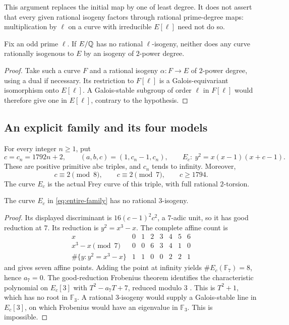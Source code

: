 This argument replaces the initial map by one of least degree. It does
not assert that every given rational isogeny factors through rational
prime-degree maps: multiplication by $\ell$ on a curve with
irreducible $E[\ell]$ need not do so.

\begin{lemma}\label{lem:entire-odd-transport}
Fix an odd prime $\ell$. If $E/\mathbb Q$ has no rational $\ell$-isogeny,
neither does any curve rationally isogenous to $E$ by an isogeny of
$2$-power degree.
\end{lemma}

\begin{proof}
Take such a curve $F$ and a rational isogeny $\alpha:F\to E$ of
$2$-power degree, using a dual if necessary. Its restriction to
$F[\ell]$ is a Galois-equivariant isomorphism onto $E[\ell]$.
A Galois-stable subgroup of order $\ell$ in $F[\ell]$ would therefore
give one in $E[\ell]$, contrary to the hypothesis.
\end{proof}

\subsection{An explicit family and its four models}

For every integer $n\ge1$, put
\begin{equation}\label{eq:entire-family}
 c=c_n=1792n+2,\qquad (a,b,c)=(1,c_n-1,c_n),\qquad
 E_c:\ y^2=x(x-1)(x+c-1).
\end{equation}
These are positive primitive abc triples, and $c_n$ tends to infinity.
Moreover,
\[
 c\equiv2\pmod8,\qquad c\equiv2\pmod7,\qquad c\ge1794.
\]
The curve $E_c$ is the actual Frey curve of this triple, with full
rational $2$-torsion.

\begin{lemma}\label{lem:entire-no-three}
The curve $E_c$ in \eqref{eq:entire-family} has no rational
$3$-isogeny.
\end{lemma}

\begin{proof}
Its displayed discriminant is $16(c-1)^2c^2$, a $7$-adic unit, so it
has good reduction at $7$. Its reduction is $y^2=x^3-x$. The complete
affine count is
\[
 \begin{array}{c|rrrrrrr}
 x&0&1&2&3&4&5&6\\ \hline
 x^3-x\pmod7&0&0&6&3&4&1&0\\
 \#\{y:y^2=x^3-x\}&1&1&0&0&2&2&1
 \end{array}
\]
and gives seven affine points. Adding the point at infinity yields
$\#E_c(\mathbb F_7)=8$, hence $a_7=0$. The good-reduction Frobenius
theorem identifies the characteristic polynomial on $E_c[3]$ with
$T^2-a_7T+7$, reduced modulo $3$
\cite[Chapters~V and~VII]{Silverman}. This is $T^2+1$, which has no
root in $\mathbb F_3$. A rational $3$-isogeny would supply a
Galois-stable line in $E_c[3]$, on which Frobenius would have an
eigenvalue in $\mathbb F_3$. This is impossible.
\end{proof}

